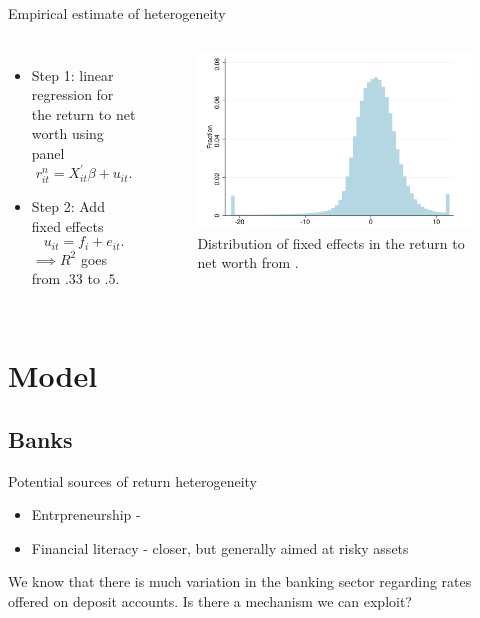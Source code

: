 \documentclass{beamer}
\begin{document}
\begin{frame}{Empirical estimate of heterogeneity}

     \begin{columns}
     \small
    \centering

    \begin{itemize}
    \item Step 1: linear regression for the return to net worth using panel
    $$ r^{n}_{it} = X^{'}_{it} \beta + u_{it}. $$
    \item Step 2: Add fixed effects
    $$ u_{it} = f_{i} + e_{it}. $$
    $\implies R^2$ goes from $.33$ to $.5$.
    \end{itemize}


    \centering
    \begin{figure}
    \includegraphics[width=\textwidth]{Figures/Fagereng2020Fig8.png}
    \captionsetup{font=scriptsize}
    \caption{Distribution of fixed effects in the return to net worth from \cite{aflgdmlp20}.}
    \end{figure}
  \end{columns}

\end{frame}

\section{Model}
\subsection{Banks}
\begin{frame}{Potential sources of return heterogeneity}
  \begin{itemize}
  \item Entrpreneurship - 
  \item Financial literacy - closer, but generally aimed at risky assets
    \end{itemize}

    \vspace{2.5mm}
    We know that there is much variation in the banking sector regarding rates offered on deposit accounts. Is there a mechanism we can exploit?
    
  \end{frame}
\end{document}
